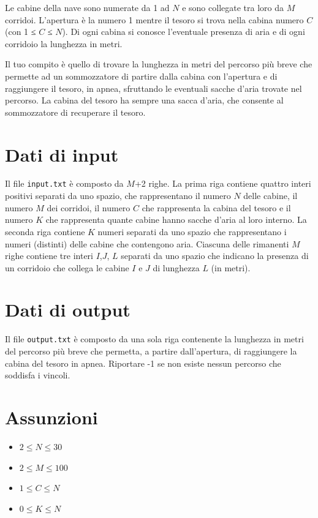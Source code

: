 \documentclass[a4paper,11pt]{article}
\begin{document}
Le cabine della nave sono numerate da 1 ad $N$ e sono collegate tra loro
da $M$ corridoi.  L'apertura  è la numero 1 mentre il tesoro si trova
nella cabina numero $C$ (con 1 ≤ $C$ ≤ $N$).  Di ogni cabina si conosce
l'eventuale presenza di aria e di ogni corridoio la lunghezza in metri.
        
Il tuo compito è quello di trovare la lunghezza in metri del percorso
più breve che permette ad un sommozzatore di partire dalla cabina con
l'apertura e di raggiungere il tesoro, in apnea, sfruttando le eventuali
sacche d'aria trovate nel percorso. La cabina del tesoro ha sempre una
sacca d'aria, che consente al sommozzatore di recuperare il tesoro.
        

\section*{Dati di input}
  
Il file \texttt{input.txt} è composto da $M$+2 righe. La prima riga
contiene quattro interi positivi separati da uno spazio, che
rappresentano il numero $N$ delle cabine, il numero $M$ dei corridoi, il
numero $C$ che rappresenta la cabina del tesoro e il numero $K$ che
rappresenta quante cabine hanno sacche d'aria al loro interno.  La
seconda riga contiene $K$ numeri separati da uno spazio che
rappresentano i numeri (distinti) delle cabine che contengono aria.
Ciascuna delle rimanenti $M$ righe contiene tre interi $I$,$J$, $L$
separati da uno spazio che indicano la presenza di un corridoio che
collega le cabine $I$ e $J$ di lunghezza $L$ (in metri).

\section*{Dati di output}
  
Il file \texttt{output.txt} è composto da una sola riga contenente la
lunghezza in metri del percorso più breve che permetta, a partire
dall'apertura, di raggiungere la cabina del tesoro in apnea.  Riportare
-1 se non esiste nessun percorso che soddisfa i vincoli.

        
\section*{Assunzioni}
\begin{itemize}
  \item $2 ≤ N ≤ 30$
  \item $2 ≤ M ≤ 100$
  \item $1 ≤ C ≤ N$
  \item $0 ≤ K ≤ N$
\end{itemize}
\end{document}
